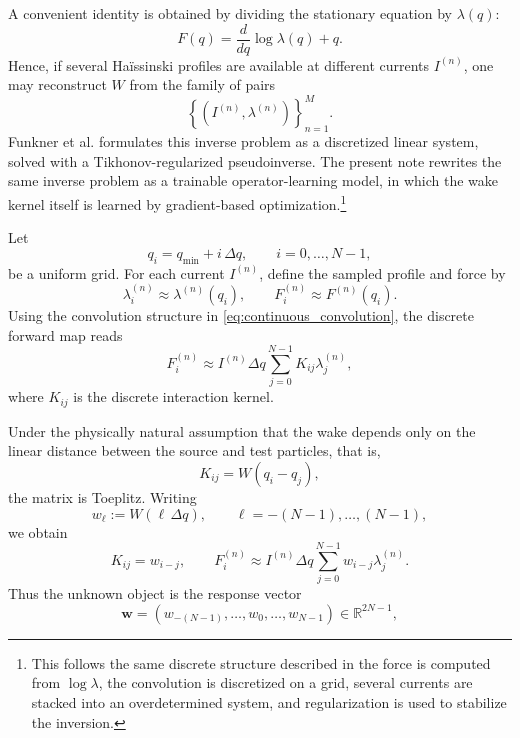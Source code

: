 \documentclass[11pt,a4paper]{article}
\begin{document}
\begin{sloppypar}
A convenient identity is obtained by dividing the stationary equation by $\lambda(q)$:
\begin{equation}
F(q)=\frac{d}{dq}\log \lambda(q)+q.
\label{eq:F_from_lambda}
\end{equation}
Hence, if several Ha\"issinski profiles are available at different currents $I^{(n)}$, one may reconstruct $W$ from the family of pairs
\begin{equation}
\left\{\left(I^{(n)},\lambda^{(n)}\right)\right\}_{n=1}^M.
\end{equation}
Funkner et al. \cite{Funkner_2025} formulates this inverse problem as a discretized linear system, solved with a Tikhonov-regularized pseudoinverse. The present note rewrites the same inverse problem as a trainable operator-learning model, in which the wake kernel itself is learned by gradient-based optimization.\footnote{This follows the same discrete structure described in \cite{Funkner_2025} the force is computed from $\log\lambda$, the convolution is discretized on a grid, several currents are stacked into an overdetermined system, and regularization is used to stabilize the inversion.}


Let
\begin{equation}
q_i = q_{\min} + i\,\Delta q, \qquad i=0,\dots,N-1,
\end{equation}
be a uniform grid. For each current $I^{(n)}$, define the sampled profile and force by
\begin{equation}
\lambda^{(n)}_i \approx \lambda^{(n)}(q_i),
\qquad
F^{(n)}_i \approx F^{(n)}(q_i).
\end{equation}
Using the convolution structure in \eqref{eq:continuous_convolution}, the discrete forward map reads
\begin{equation}
F^{(n)}_i \approx I^{(n)}\Delta q \sum_{j=0}^{N-1} K_{ij}\lambda^{(n)}_j,
\label{eq:generic_discrete_operator}
\end{equation}
where $K_{ij}$ is the discrete interaction kernel.

Under the physically natural assumption that the wake depends only on the linear distance between the source and test particles, that is,
\begin{equation}
K_{ij}=W(q_i-q_j),
\end{equation}
the matrix is Toeplitz. Writing
\begin{equation}
w_{\ell} := W(\ell\,\Delta q), \qquad \ell = -(N-1),\dots,(N-1),
\end{equation}
we obtain
\begin{equation}
K_{ij} = w_{i-j},
\qquad
F^{(n)}_i \approx I^{(n)}\Delta q\sum_{j=0}^{N-1} w_{i-j}\lambda^{(n)}_j.
\label{eq:toeplitz_forward}
\end{equation}
Thus the unknown object is the response vector
\begin{equation}
\bm{w}=(w_{-(N-1)},\dots,w_0,\dots,w_{N-1})\in\mathbb{R}^{2N-1},
\end{equation}


\end{sloppypar}
\end{document}
